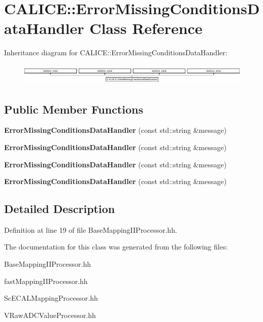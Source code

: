 \section{C\-A\-L\-I\-C\-E\-:\-:Error\-Missing\-Conditions\-Data\-Handler Class Reference}
\label{classCALICE_1_1ErrorMissingConditionsDataHandler}
Inheritance diagram for C\-A\-L\-I\-C\-E\-:\-:Error\-Missing\-Conditions\-Data\-Handler\-:\begin{figure}[H]
\begin{center}
\leavevmode
\includegraphics[height=1.021898cm]{classCALICE_1_1ErrorMissingConditionsDataHandler}
\end{center}
\end{figure}
\subsection*{Public Member Functions}
\begin{DoxyCompactItemize}
\item 
{\bfseries Error\-Missing\-Conditions\-Data\-Handler} (const std\-::string \&message)\label{classCALICE_1_1ErrorMissingConditionsDataHandler_a0a85b29547427c53f0c9f5ba5b3070b0}

\item 
{\bfseries Error\-Missing\-Conditions\-Data\-Handler} (const std\-::string \&message)\label{classCALICE_1_1ErrorMissingConditionsDataHandler_a0a85b29547427c53f0c9f5ba5b3070b0}

\item 
{\bfseries Error\-Missing\-Conditions\-Data\-Handler} (const std\-::string \&message)\label{classCALICE_1_1ErrorMissingConditionsDataHandler_a0a85b29547427c53f0c9f5ba5b3070b0}

\item 
{\bfseries Error\-Missing\-Conditions\-Data\-Handler} (const std\-::string \&message)\label{classCALICE_1_1ErrorMissingConditionsDataHandler_a0a85b29547427c53f0c9f5ba5b3070b0}

\end{DoxyCompactItemize}


\subsection{Detailed Description}


Definition at line 19 of file Base\-Mapping\-I\-I\-Processor.\-hh.



The documentation for this class was generated from the following files\-:\begin{DoxyCompactItemize}
\item 
Base\-Mapping\-I\-I\-Processor.\-hh\item 
fast\-Mapping\-I\-I\-Processor.\-hh\item 
Sc\-E\-C\-A\-L\-Mapping\-Processor.\-hh\item 
V\-Raw\-A\-D\-C\-Value\-Processor.\-hh\end{DoxyCompactItemize}
